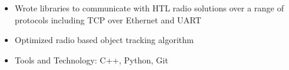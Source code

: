 \begin{itemize}
    \setlength\itemsep{0pt}
    \setlength{\parskip}{0pt}
    \item Wrote libraries to communicate with HTL radio solutions over a range of protocols including TCP over Ethernet and UART
    \item Optimized radio based object tracking algorithm
    \item Tools and Technology: C++, Python, Git
\end{itemize}
